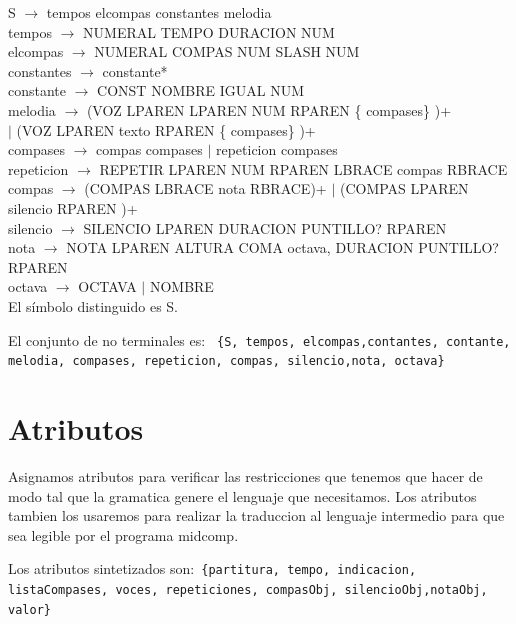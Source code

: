 \documentclass[a4paper]{article}
\begin{document}
S $\rightarrow$ tempos elcompas constantes melodia \\
tempos $\rightarrow$ NUMERAL TEMPO DURACION NUM \\
elcompas $\rightarrow$  NUMERAL COMPAS NUM SLASH NUM \\
constantes $\rightarrow$  constante* \\
constante $\rightarrow$  CONST NOMBRE IGUAL NUM \\
melodia $\rightarrow$  (VOZ LPAREN LPAREN NUM RPAREN \{ compases\} )+ \\$|$ (VOZ LPAREN texto RPAREN \{ compases\} )+ \\
compases $\rightarrow$ compas compases $|$ repeticion compases \\
repeticion $\rightarrow$ REPETIR LPAREN NUM RPAREN LBRACE compas RBRACE \\
compas $\rightarrow$ (COMPAS LBRACE nota RBRACE)+ $|$ (COMPAS LPAREN silencio RPAREN )+ \\
silencio $\rightarrow$ SILENCIO LPAREN DURACION PUNTILLO? RPAREN  \\
nota $\rightarrow$ NOTA LPAREN ALTURA COMA octava, DURACION PUNTILLO? RPAREN  \\
octava $\rightarrow$ OCTAVA $|$ NOMBRE \\




El símbolo distinguido es S.\linebreak



El conjunto de no terminales es:\linebreak
\texttt{
\{S, tempos, elcompas,contantes, contante, melodia, compases, repeticion, compas, silencio,nota, octava\}  \\
} 

\section{Atributos}

Asignamos atributos para verificar las restricciones que tenemos que hacer de modo tal que la gramatica genere el lenguaje que necesitamos.
Los atributos tambien los usaremos para realizar la traduccion al lenguaje intermedio para que sea legible por el programa midcomp. \linebreak


Los atributos sintetizados son:\texttt{
\{partitura, tempo, indicacion, listaCompases, voces, repeticiones, compasObj, silencioObj,notaObj, valor\}
}\linebreak
\end{document}
